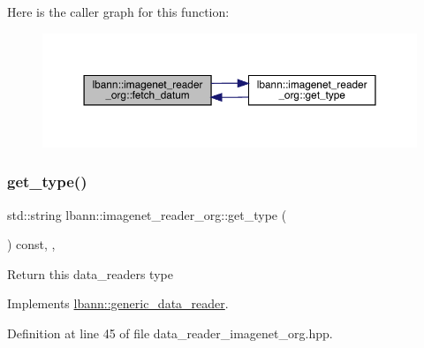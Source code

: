 Here is the caller graph for this function\+:\nopagebreak
\begin{figure}[H]
\begin{center}
\leavevmode
\includegraphics[width=350pt]{classlbann_1_1imagenet__reader__org_ad4c47413e16c1c53000b7d7be757ff6e_icgraph}
\end{center}
\end{figure}
\mbox{\label{classlbann_1_1imagenet__reader__org_ade6e7e9bc1a3f9562c0f274a3d665e0a}} 
\subsubsection{\texorpdfstring{get\+\_\+type()}{get\_type()}}
{\footnotesize\ttfamily std\+::string lbann\+::imagenet\+\_\+reader\+\_\+org\+::get\+\_\+type (\begin{DoxyParamCaption}{ }\end{DoxyParamCaption}) const\hspace{0.3cm}{\ttfamily [inline]}, {\ttfamily [override]}, {\ttfamily [virtual]}}

Return this data\+\_\+reader\textquotesingle{}s type 

Implements \hyperlink{classlbann_1_1generic__data__reader_abeb849fb8e10b4fa317c90bc33f61758}{lbann\+::generic\+\_\+data\+\_\+reader}.



Definition at line 45 of file data\+\_\+reader\+\_\+imagenet\+\_\+org.\+hpp.


